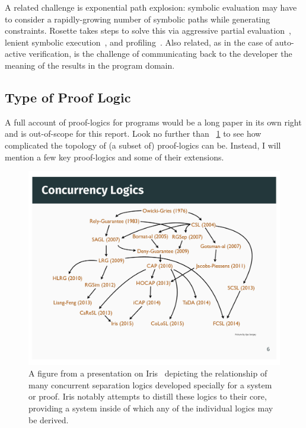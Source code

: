 A related challenge is exponential path explosion: symbolic evaluation may have
to consider a rapidly-growing number of symbolic paths while generating
constraints. Rosette takes steps to solve this via aggressive partial
evaluation~\cite{Torlak_2013,Torlak_2014}, lenient symbolic
execution~\cite{Chang_2018}, and
profiling~\cite{Bornholt_2018,Porncharoenwase_2020}. Also related, as in the
case of auto-active verification, is the challenge of communicating back to the
developer the meaning of the results in the program domain.

\subsection{Type of Proof Logic}\label{S:t_logic}

A full account of proof-logics for programs would be a long paper in its own
right and is out-of-scope for this report. Look no further than
\figurename~\ref{F:iris_complex} to see how complicated the topology of (a
subset of) proof-logics can be. Instead, I will mention a few key proof-logics
and some of their extensions.

\begin{figure}
    \centering
    \includegraphics[width=\textwidth]{img/iris_2_0_concurrent_logics}
    \caption{A figure from a presentation on Iris~\cite{Jung_2016_slides}
    depicting the relationship of many concurrent separation logics developed
    specially for a system or proof. Iris notably attempts to distill these
    logics to their core, providing a system inside of which any of the
    individual logics may be derived.}\label{F:iris_complex}
\end{figure}

